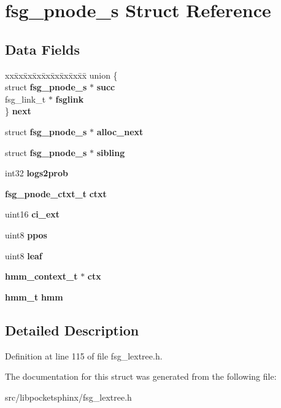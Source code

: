 \section{fsg\-\_\-pnode\-\_\-s Struct Reference}
\label{structfsg__pnode__s}
\subsection*{Data Fields}
\begin{DoxyCompactItemize}
\item 
\begin{tabbing}
xx\=xx\=xx\=xx\=xx\=xx\=xx\=xx\=xx\=\kill
union \{\\
\>struct {\bf fsg\_pnode\_s} $\ast$ {\bfseries succ}\\
\>fsg\_link\_t $\ast$ {\bfseries fsglink}\\
\} {\bfseries next}\label{structfsg__pnode__s_a7196e1901e221fae9e6b868cfeecd4b8}
\\

\end{tabbing}\item 
struct {\bf fsg\-\_\-pnode\-\_\-s} $\ast$ {\bfseries alloc\-\_\-next}\label{structfsg__pnode__s_adbea4e213a25b2c89ba594b7d8c54196}

\item 
struct {\bf fsg\-\_\-pnode\-\_\-s} $\ast$ {\bfseries sibling}\label{structfsg__pnode__s_ad1c7c85e434a067aca06676e84b0ad99}

\item 
int32 {\bfseries logs2prob}\label{structfsg__pnode__s_a2f4fd8578c19663f172d66b63d5a3ab7}

\item 
{\bf fsg\-\_\-pnode\-\_\-ctxt\-\_\-t} {\bfseries ctxt}\label{structfsg__pnode__s_abec388a73d3f027103f4dad6d1489a70}

\item 
uint16 {\bfseries ci\-\_\-ext}\label{structfsg__pnode__s_a961279d7d814232be14050825571fa25}

\item 
uint8 {\bfseries ppos}\label{structfsg__pnode__s_a340a46ef9dfecc230cce91d58c7a1001}

\item 
uint8 {\bfseries leaf}\label{structfsg__pnode__s_a0e14d21465f3c96ae5df22562db52988}

\item 
{\bf hmm\-\_\-context\-\_\-t} $\ast$ {\bfseries ctx}\label{structfsg__pnode__s_a62ddacb58cd22e260f60d6bcef286f6f}

\item 
{\bf hmm\-\_\-t} {\bfseries hmm}\label{structfsg__pnode__s_afc1c0ea784c371c8e916df6ab56d81d1}

\end{DoxyCompactItemize}


\subsection{Detailed Description}


Definition at line 115 of file fsg\-\_\-lextree.\-h.



The documentation for this struct was generated from the following file\-:\begin{DoxyCompactItemize}
\item 
src/libpocketsphinx/fsg\-\_\-lextree.\-h\end{DoxyCompactItemize}
